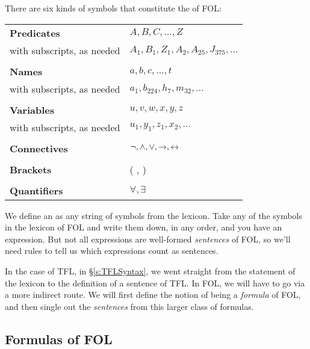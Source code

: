 There are six kinds of symbols that constitute the  of FOL:
\begin{center}
\begin{tabular}{l l}
\textbf{Predicates} & $A,B,C,\ldots,Z$\\
with subscripts, as needed & $A_1, B_1,Z_1,A_2,A_{25},J_{375},\ldots$\\
\\
\textbf{Names} & $a,b,c,\ldots, t$\\
with subscripts, as needed & $a_1, b_{224}, h_7, m_{32},\ldots$\\
\\
\textbf{Variables} & $u, v, w, x,y,z$\\
with subscripts, as needed & $u_1, y_1, z_1, x_2,\ldots$\\
\\
\textbf{Connectives} & $\neg,\wedge,\vee,\rightarrow,\leftrightarrow$\\
\\
\textbf{Brackets} &( , )\\
\\
\textbf{Quantifiers} & $\forall, \exists$\\
\end{tabular}
\end{center}
We define an  as any string of symbols from the lexicon. Take any of the symbols in the lexicon of FOL and write them down, in any order, and you have an expression.  But not all expressions are well-formed \emph{sentences} of FOL, so we'll need rules to tell us which expressions count as sentences.


In the case of TFL, in \S\ref{s:TFLSyntax}, we went straight from the statement of the lexicon to the definition of a sentence of TFL. In FOL, we will have to go via a more indirect route.  We will first define the notion of being a  \emph{formula} of FOL, and then single out the \emph{sentences} from this larger class of formulas.

\subsection{Formulas of FOL}

